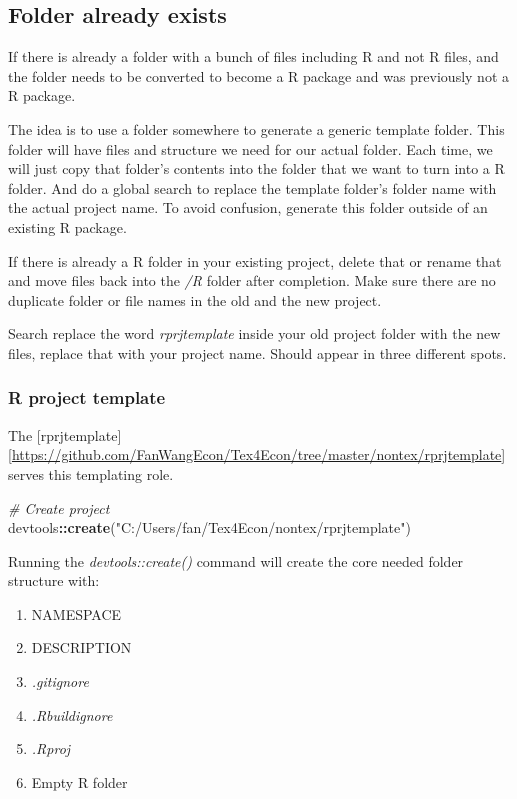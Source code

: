 \documentclass[
]{article}
\newenvironment{Shaded}{\begin{snugshade}}{\end{snugshade}}
\newcommand{\CommentTok}[1]{\textcolor[rgb]{0.56,0.35,0.01}{\textit{#1}}}
\newcommand{\KeywordTok}[1]{\textcolor[rgb]{0.13,0.29,0.53}{\textbf{#1}}}
\newcommand{\NormalTok}[1]{#1}
\newcommand{\OperatorTok}[1]{\textcolor[rgb]{0.81,0.36,0.00}{\textbf{#1}}}
\newcommand{\StringTok}[1]{\textcolor[rgb]{0.31,0.60,0.02}{#1}}
\providecommand{\tightlist}{%
  \setlength{\itemsep}{0pt}\setlength{\parskip}{0pt}}
\begin{document}
\hypertarget{folder-already-exists}{%
\subsection{Folder already exists}\label{folder-already-exists}}

If there is already a folder with a bunch of files including R and not R
files, and the folder needs to be converted to become a R package and
was previously not a R package.

The idea is to use a folder somewhere to generate a generic template
folder. This folder will have files and structure we need for our actual
folder. Each time, we will just copy that folder's contents into the
folder that we want to turn into a R folder. And do a global search to
replace the template folder's folder name with the actual project name.
To avoid confusion, generate this folder outside of an existing R
package.

If there is already a R folder in your existing project, delete that or
rename that and move files back into the \emph{/R} folder after
completion. Make sure there are no duplicate folder or file names in the
old and the new project.

Search replace the word \emph{rprjtemplate} inside your old project
folder with the new files, replace that with your project name. Should
appear in three different spots.

\hypertarget{r-project-template}{%
\subsubsection{R project template}\label{r-project-template}}

The
{[}rprjtemplate{]}{[}\url{https://github.com/FanWangEcon/Tex4Econ/tree/master/nontex/rprjtemplate}{]}
serves this templating role.

\begin{Shaded}
\begin{Highlighting}[]
\CommentTok{# Create project}
\NormalTok{devtools}\OperatorTok{::}\KeywordTok{create}\NormalTok{(}\StringTok{"C:/Users/fan/Tex4Econ/nontex/rprjtemplate"}\NormalTok{)}
\end{Highlighting}
\end{Shaded}

Running the \emph{devtools::create()} command will create the core
needed folder structure with:

\begin{enumerate}
\def\labelenumi{\arabic{enumi}.}
\tightlist
\item
  NAMESPACE
\item
  DESCRIPTION
\item
  \emph{.gitignore}
\item
  \emph{.Rbuildignore}
\item
  \emph{.Rproj}
\item
  Empty R folder
\end{enumerate}
\end{document}
